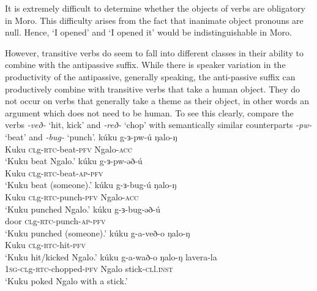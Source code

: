 It is extremely difficult to determine whether the objects of verbs are obligatory in Moro. This difficulty arises from the fact that inanimate object pronouns are null. Hence, `I opened' and `I opened it' would be indistinguishable in Moro. 

However, transitive verbs do seem to fall into different classes in their ability to combine with the antipassive suffix. While there is speaker variation in the productivity of the antipassive, generally speaking, the anti-passive suffix can productively combine with transitive verbs that take a human object. They do not occur on verbs that generally take a theme as their object, in other words an argument which does not need to be human. To see this clearly, compare the verbs \textit{-veð-} `hit, kick' and \textit{-reð-} `chop' with semantically similar counterparts \textit{-pw-} `beat' and \textit{-bug-} `punch'.
 \ea 
	\ea \gll kúku g-ɜ-pw-ú ŋalo-ŋ\\
 		Kuku		\textsc{cl}g-\textsc{rtc-}beat-\textsc{pfv} Ngalo-\textsc{acc}\\
		\glt ‘Kuku beat Ngalo.’
	\ex \gll kúku g-ɜ-pw-əð-ú	\\
		Kuku	\textsc{cl}g-\textsc{rtc-}beat-\textsc{ap-pfv}\\	
		\glt ‘Kuku beat (someone).’
	\z
\ex \ea \gll kúku g-ɜ-bug-ú ŋalo-ŋ\\
		Kuku \textsc{cl}g-\textsc{rtc-}punch-\textsc{pfv} Ngalo-\textsc{acc}\\
		\glt ‘Kuku punched Ngalo.’
	\ex \gll kúku  g-ɜ-bug-əð-ú	\\
		door \textsc{cl}g-\textsc{rtc-}punch-\textsc{ap-pfv}\\
		\glt ‘Kuku punched (someone).’
	\z %
\ex \ea \gll kúku g-a-veð-o ŋalo-ŋ\\
 		Kuku		\textsc{cl}g-\textsc{rtc-}hit-\textsc{pfv}\\
		\glt ‘Kuku hit/kicked Ngalo.’
	\z
\ex \ea \gll kúku g-a-wað-o ŋalo-ŋ lavera-la\\
		\textsc{1sg-cl}g-\textsc{rtc-}chopped-\textsc{pfv} Ngalo stick-\textsc{cl}l.\textsc{inst}\\
		\glt ‘Kuku poked Ngalo with a stick.’
	\label{ex:ch12:injections}
	\z 
\z 
